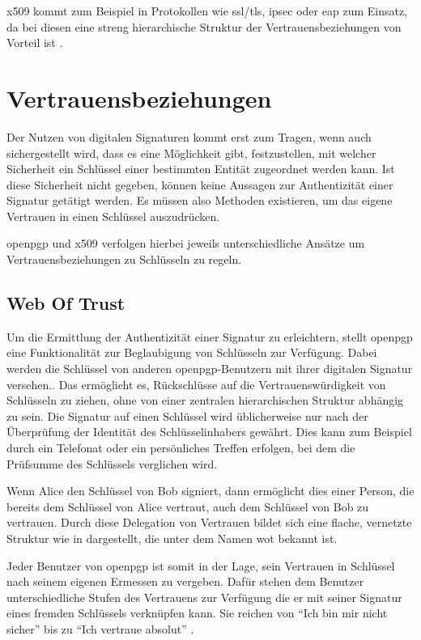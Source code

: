 \gls{x509} kommt zum Beispiel in Protokollen wie \gls{ssl}/\gls{tls}, \gls{ipsec} oder \gls{eap} zum Einsatz, da bei diesen eine streng hierarchische Struktur
der Vertrauensbeziehungen von Vorteil ist \cite{kits}.

\section{Vertrauensbeziehungen}
Der Nutzen von digitalen Signaturen kommt erst zum Tragen, wenn auch sichergestellt wird, dass es eine Möglichkeit gibt, festzustellen, mit welcher Sicherheit
ein Schlüssel einer bestimmten Entität zugeordnet werden kann. Ist diese Sicherheit nicht gegeben, können keine Aussagen zur Authentizität einer Signatur
getätigt werden. Es müssen also Methoden existieren, um das eigene Vertrauen in einen Schlüssel auszudrücken.

\gls{openpgp} und \gls{x509} verfolgen hierbei jeweils unterschiedliche Ansätze um Vertrauensbeziehungen zu Schlüsseln zu regeln.

\subsection{Web Of Trust}
Um die Ermittlung der Authentizität einer Signatur zu erleichtern, stellt \gls{openpgp} eine Funktionalität zur Beglaubigung von Schlüsseln zur Verfügung. Dabei
werden die Schlüssel von anderen \gls{openpgp}-Benutzern mit ihrer digitalen Signatur versehen.. Das ermöglicht es, Rückschlüsse auf die Vertrauenswürdigkeit
von Schlüsseln zu ziehen, ohne von einer zentralen hierarchischen Struktur abhängig zu sein. Die Signatur auf einen Schlüssel wird üblicherweise nur nach der
Überprüfung der Identität des Schlüsselinhabers gewährt. Dies kann zum Beispiel durch ein Telefonat oder ein persönliches Treffen erfolgen, bei dem die
Prüfsumme des Schlüssels verglichen wird.  

Wenn Alice den Schlüssel von Bob signiert, dann ermöglicht dies einer Person, die bereits dem Schlüssel von Alice vertraut, auch dem Schlüssel von Bob zu
vertrauen. Durch diese Delegation von Vertrauen bildet sich eine flache, vernetzte Struktur wie in  dargestellt, die unter dem Namen \gls{wot}
bekannt ist. 

Jeder Benutzer von \gls{openpgp} ist somit in der Lage, sein Vertrauen in Schlüssel nach seinem eigenen Ermessen zu vergeben. Dafür stehen dem
Benutzer unterschiedliche Stufen des Vertrauens zur Verfügung die er mit seiner Signatur eines fremden Schlüssels verknüpfen kann. Sie reichen von "`Ich bin mir
nicht sicher"' bis zu "`Ich vertraue absolut"' \cite{pgp}.

